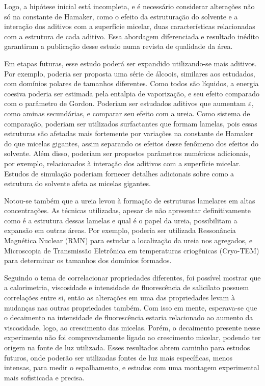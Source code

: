 	Logo, a hipótese inicial está incompleta, e é necessário considerar alterações não só na constante de Hamaker, como o efeito da estruturação do solvente e a interação dos aditivos com a superfície micelar, duas características relacionadas com a estrutura de cada aditivo. Essa abordagem diferenciada e resultado inédito garantiram a publicação desse estudo numa revista de qualidade da área.
	
	Em etapas futuras, esse estudo poderá ser expandido utilizando-se mais aditivos. Por exemplo, poderia ser proposta uma série de álcoois, similares aos estudados, com domínios polares de tamanhos diferentes. Como todos são líquidos, a energia coesiva poderia ser estimada pela entalpia de vaporização, e seu efeito comparado com o parâmetro de Gordon. Poderiam ser estudados aditivos que aumentam \(\varepsilon\), como aminas secundárias, e comparar seu efeito com a ureia. Como sistema de comparação, poderiam ser utilizados surfactantes que formam lamelas, pois essas estruturas são afetadas mais fortemente por variações na constante de Hamaker do que micelas gigantes, assim separando os efeitos desse fenômeno dos efeitos do solvente. Além disso, poderiam ser propostos parâmetros numéricos adicionais, por exemplo, relacionados à interação dos aditivos com a superfície micelar. Estudos de simulação poderiam fornecer detalhes adicionais sobre como a estrutura do solvente afeta as micelas gigantes.
	
	Notou-se também que a ureia levou à formação de estruturas lamelares em altas concentrações. As técnicas utilizadas, apesar de não apresentar definitivamente como é a estrutura dessas lamelas e qual é o papel da ureia, possibilitam a expansão em outras áreas. Por exemplo, poderia ser utilizada Ressonância Magnética Nuclear (RMN) para estudar a localização da ureia nos agregados, e Microscopia de Transmissão Eletrônica em temperaturas criogênicas (Cryo-TEM) para determinar os tamanhos dos domínios formados.
	
	Seguindo o tema de correlacionar propriedades diferentes, foi possível mostrar que a calorimetria, viscosidade e intensidade de fluorescência de salicilato possuem correlações entre si, então as alterações em uma das propriedades levam à mudanças nas outras propriedades também. Com isso em mente, esperava-se que o decaimento na intensidade de fluorescência estaria relacionado ao aumento da viscosidade, logo, ao crescimento das micelas. Porém, o decaimento presente nesse experimento não foi comprovadamente ligado ao crescimento micelar, podendo ter origem na fonte de luz utilizada. Esses resultados abrem caminho para estudos futuros, onde poderão ser utilizadas fontes de luz mais específicas, menos intensas, para medir o espalhamento, e estudos com uma montagem experimental mais sofisticada e precisa.
	

